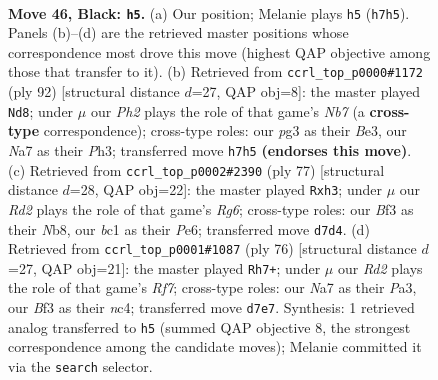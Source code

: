 \documentclass[11pt]{article}
\begin{document}
\clearpage

\begin{figure}[p]\centering
\begin{subfigure}{0.46\textwidth}\centering
\resizebox{\linewidth}{!}{%
\newchessgame
\chessboard[
  setfen={5K1k/n1Pr3p/p7/P4p2/4p3/5bP1/8/RNB5 b - - 2 46},
  showmover=false,
  pgfstyle=straightmove, color=movearrow, markmove={h7-h5}
]}
\caption{}
\end{subfigure}\hfill
\begin{subfigure}{0.46\textwidth}\centering
\resizebox{\linewidth}{!}{%
\newchessgame
\chessboard[
  setfen={2r3k1/1N1R3p/6p1/4b3/n5P1/4B2P/5P2/5K2 w - - 3 47},
  showmover=false,
  pgfstyle=straightmove, color=movearrow, markmove={b7-d8}
]}
\caption{}
\end{subfigure}
\\[4pt]
\begin{subfigure}{0.46\textwidth}\centering
\resizebox{\linewidth}{!}{%
\newchessgame
\chessboard[
  setfen={1n6/1P2kp2/1N2p1p1/4P2p/1R6/6rP/4K3/8 b - - 2 39},
  showmover=false,
  pgfstyle=straightmove, color=movearrow, markmove={g3-h3}
]}
\caption{}
\end{subfigure}\hfill
\begin{subfigure}{0.46\textwidth}\centering
\resizebox{\linewidth}{!}{%
\newchessgame
\chessboard[
  setfen={3r3k/pp2pR2/6B1/1P6/2np3P/P5PK/8/8 w - - 0 39},
  showmover=false,
  pgfstyle=straightmove, color=movearrow, markmove={f7-h7}
]}
\caption{}
\end{subfigure}
\caption{\textbf{Move 46, Black: \texttt{h5}.} (a) Our position; Melanie plays \texttt{h5} (\texttt{h7h5}). Panels (b)--(d) are the retrieved master positions whose correspondence most drove this move (highest QAP objective among those that transfer to it). (b) Retrieved from \texttt{ccrl\_top\_p0000\#1172} (ply 92) [structural distance $d$=27, QAP obj=8]: the master played \texttt{Nd8}; under $\mu$ our \emph{Ph2} plays the role of that game's \emph{Nb7} (a \textbf{cross-type} correspondence); cross-type roles: our \emph{p}g3 as their \emph{B}e3, our \emph{N}a7 as their \emph{P}h3; transferred move \texttt{h7h5} \textbf{(endorses this move)}. (c) Retrieved from \texttt{ccrl\_top\_p0002\#2390} (ply 77) [structural distance $d$=28, QAP obj=22]: the master played \texttt{Rxh3}; under $\mu$ our \emph{Rd2} plays the role of that game's \emph{Rg6}; cross-type roles: our \emph{B}f3 as their \emph{N}b8, our \emph{b}c1 as their \emph{P}e6; transferred move \texttt{d7d4}. (d) Retrieved from \texttt{ccrl\_top\_p0001\#1087} (ply 76) [structural distance $d$=27, QAP obj=21]: the master played \texttt{Rh7+}; under $\mu$ our \emph{Rd2} plays the role of that game's \emph{Rf7}; cross-type roles: our \emph{N}a7 as their \emph{P}a3, our \emph{B}f3 as their \emph{n}c4; transferred move \texttt{d7e7}. Synthesis: 1 retrieved analog transferred to \texttt{h5} (summed QAP objective 8, the strongest correspondence among the candidate moves); Melanie committed it via the \texttt{search} selector.}
\label{fig:thought-m91}
\end{figure}
\end{document}
